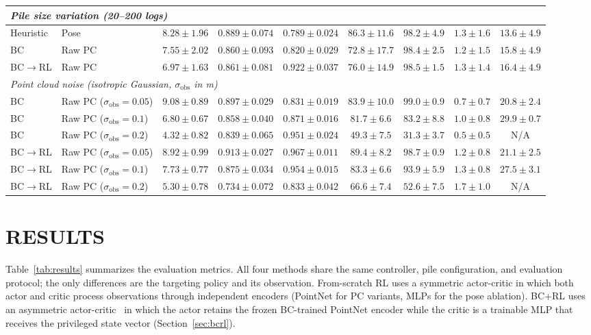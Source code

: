 \documentclass[letterpaper, 10 pt, conference]{ieeeconf}
\begin{document}
\begin{table}[!t]
\begin{tabular*}{\textwidth}{@{\extracolsep{\fill}}llccccccc@{}}
\midrule
\multicolumn{9}{l}{\textit{Pile size variation (20--200 logs)}} \\
\midrule
Heuristic & Pose   & $8.28 \pm 1.96$ & $0.889 \pm 0.074$ & $0.789 \pm 0.024$ & $86.3 \pm 11.6$ & $98.2 \pm 4.9$ & $1.3 \pm 1.6$ & $13.6 \pm 4.9$ \\
\addlinespace
BC        & Raw PC & $7.55 \pm 2.02$ & $0.860 \pm 0.093$ & $0.820 \pm 0.029$ & $72.8 \pm 17.7$ & $98.4 \pm 2.5$ & $1.2 \pm 1.5$ & $15.8 \pm 4.9$ \\
BC$\to$RL & Raw PC & $6.97 \pm 1.63$ & $0.861 \pm 0.081$ & $0.922 \pm 0.037$ & $76.0 \pm 14.9$ & $98.5 \pm 1.5$ & $1.3 \pm 1.4$ & $16.4 \pm 4.9$ \\
\midrule
\multicolumn{9}{l}{\textit{Point cloud noise (isotropic Gaussian, $\sigma_{\mathrm{obs}}$ in m)}} \\
\midrule
BC        & Raw PC ($\sigma_{\mathrm{obs}}{=}0.05$) & $9.08 \pm 0.89$ & $0.897 \pm 0.029$ & $0.831 \pm 0.019$ & $83.9 \pm 10.0$ & $99.0 \pm 0.9$ & $0.7 \pm 0.7$ & $20.8 \pm 2.4$ \\
BC        & Raw PC ($\sigma_{\mathrm{obs}}{=}0.1$)  & $6.80 \pm 0.67$ & $0.858 \pm 0.040$ & $0.871 \pm 0.016$ & $81.7 \pm 6.6$ & $83.2 \pm 8.8$ & $1.0 \pm 0.8$ & $29.9 \pm 0.7$ \\
BC        & Raw PC ($\sigma_{\mathrm{obs}}{=}0.2$)  & $4.32 \pm 0.82$ & $0.839 \pm 0.065$ & $0.951 \pm 0.024$ & $49.3 \pm 7.5$ & $31.3 \pm 3.7$ & $0.5 \pm 0.5$ & N/A \\
\addlinespace
BC$\to$RL & Raw PC ($\sigma_{\mathrm{obs}}{=}0.05$) & $8.92 \pm 0.99$ & $0.913 \pm 0.027$ & $0.967 \pm 0.011$ & $89.4 \pm 8.2$ & $98.7 \pm 0.9$ & $1.2 \pm 0.8$ & $21.1 \pm 2.5$ \\
BC$\to$RL & Raw PC ($\sigma_{\mathrm{obs}}{=}0.1$)  & $7.73 \pm 0.77$ & $0.875 \pm 0.034$ & $0.954 \pm 0.015$ & $83.3 \pm 6.6$ & $93.9 \pm 5.9$ & $1.3 \pm 0.8$ & $27.5 \pm 3.1$ \\
BC$\to$RL & Raw PC ($\sigma_{\mathrm{obs}}{=}0.2$)  & $5.30 \pm 0.78$ & $0.734 \pm 0.072$ & $0.833 \pm 0.042$ & $66.6 \pm 7.4$ & $52.6 \pm 7.5$ & $1.7 \pm 1.0$ & N/A \\
\bottomrule
\end{tabular*}
\end{table}
\section{RESULTS}
\label{sec:results}

Table~\ref{tab:results} summarizes the evaluation metrics.
All four methods share the same controller, pile configuration, and evaluation protocol; the only differences are the targeting policy and its observation.
From-scratch RL uses a symmetric actor-critic in which both actor and critic process observations through independent encoders (PointNet for PC variants, MLPs for the pose ablation).
BC+RL uses an asymmetric actor-critic~\cite{pinto2018asymmetric} in which the actor retains the frozen BC-trained PointNet encoder while the critic is a trainable MLP that receives the privileged state vector (Section~\ref{sec:bcrl}).
\end{document}
